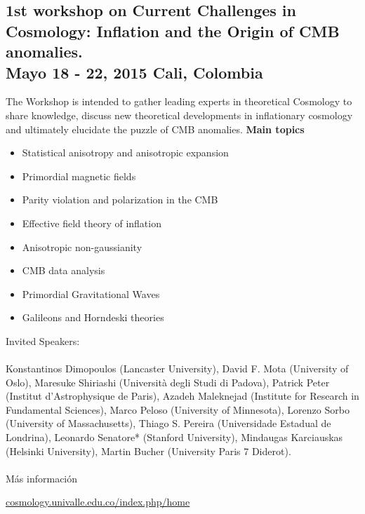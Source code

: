 \documentclass{book}
\begin{document}
\subsection{1st workshop on Current Challenges in Cosmology: Inflation and the Origin of CMB anomalies.\\ Mayo 18 - 22, 2015 Cali, Colombia}
The Workshop is intended to gather leading experts in theoretical Cosmology to share knowledge, discuss new theoretical developments in inflationary cosmology and ultimately elucidate the puzzle of CMB anomalies. 
\textbf{Main topics}
\begin{itemize}
\item Statistical anisotropy and anisotropic expansion
\item Primordial magnetic fields
\item Parity violation and polarization in the CMB
\item Effective field theory of inflation
\item Anisotropic non-gaussianity
\item CMB data analysis
\item Primordial Gravitational  Waves
\item Galileons and Horndeski theories
\end{itemize}
\par
\noindent Invited Speakers:\\
\\
Konstantinos Dimopoulos (Lancaster University),	David F. Mota (University of Oslo), Maresuke Shiriashi (Università degli Studi di Padova), Patrick Peter
(Institut d’Astrophysique de Paris), Azadeh Maleknejad (Institute for Research in Fundamental Sciences), Marco Peloso (University of Minnesota), Lorenzo Sorbo (University of Massachusetts), Thiago S. Pereira (Universidade Estadual de Londrina), Leonardo Senatore* (Stanford University), Mindaugas Karciauskas (Helsinki University), Martin Bucher (University Paris 7 Diderot).\\
\\
Más información

\begin{center}
\url{cosmology.univalle.edu.co/index.php/home}
\end{center}
\end{document}

